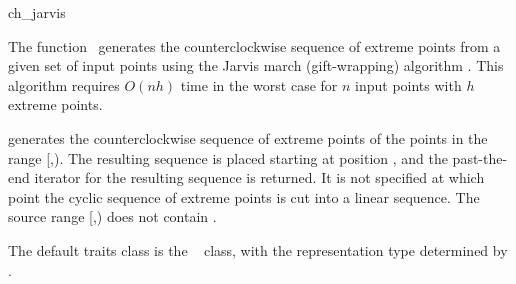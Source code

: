 
\begin{ccRefFunction}{ch_jarvis}  %

\ccDefinition
  
The function \ccRefName\ generates the counterclockwise sequence of extreme
points from a given set of input points using the Jarvis march (gift-wrapping)
algorithm \cite{j-ichfs-73}. This algorithm requires $O(n h)$ time 
in the worst case for $n$ input points with $h$ extreme points.  


            {generates the counterclockwise sequence of extreme points
            of the points in the range [,).
            The resulting sequence is placed starting at position
            , and the past-the-end iterator for the resulting
            sequence is returned. It is not specified at which point the
            cyclic sequence of extreme points is cut into a linear sequence.
            \ccPrecond %
            The source range [,) does not contain
            .}

The default traits class  is the \cgal\
 class,%
with the representation type determined by .


\end{ccRefFunction}
